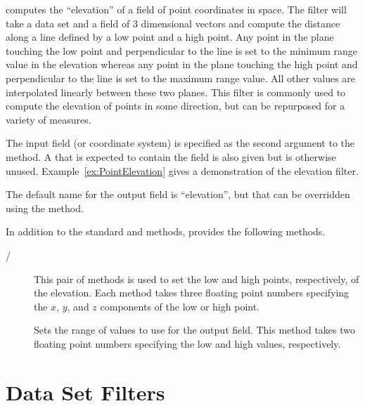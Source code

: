  computes the ``elevation'' of a field of point
coordinates in space. The filter will take a data set and a field of 3
dimensional vectors and compute the distance along a line defined by a low
point and a high point. Any point in the plane touching the low point and
perpendicular to the line is set to the minimum range value in the
elevation whereas any point in the plane touching the high point and
perpendicular to the line is set to the maximum range value. All other
values are interpolated linearly between these two planes. This filter is
commonly used to compute the elevation of points in some direction, but can
be repurposed for a variety of measures.

The input field (or coordinate system) is specified as the second argument
to the  method. A  that is expected to
contain the field is also given but is otherwise unused.
Example~\ref{ex:PointElevation} gives a demonstration of the elevation
filter.

The default name for the output field is ``elevation'', but that can be
overridden using the  method.

In addition to the standard  and
 methods,  provides the
following methods.

\begin{description}
\item[/] This pair of methods
  is used to set the low and high points, respectively, of the elevation.
  Each method takes three floating point numbers specifying the $x$, $y$,
  and $z$ components of the low or high point.
\item[] Sets the range of values to use for the output
  field. This method takes two floating point numbers specifying the low
  and high values, respectively.
\end{description}




\section{Data Set Filters}


